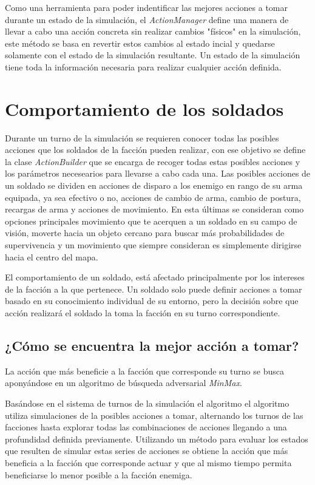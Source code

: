 \documentclass[twoside]{article}
\begin{document}
Como una herramienta para poder indentificar las mejores acciones a tomar durante un estado de la simulaci\'on, el \emph{ActionManager} define una manera de llevar a cabo una acci\'on concreta sin realizar cambios "f\'isicos" en la simulaci\'on, este m\'etodo se basa en revertir estos cambios al estado incial y quedarse solamente con el estado de la simulaci\'on resultante. Un estado de la simulaci\'on tiene toda la informaci\'on necesaria para realizar cualquier acci\'on definida. 


\section{Comportamiento de los soldados}

Durante un turno de la simulaci\'on se requieren conocer todas las posibles acciones que los soldados de la facci\'on pueden realizar, con ese objetivo se define la clase \emph{ActionBuilder} que se encarga de recoger todas estas posibles acciones y los par\'ametros necesearios para llevarse a cabo cada una. Las posibles acciones de un soldado se dividen en acciones de disparo a los enemigo en rango de su arma equipada, ya sea efectivo o no, acciones de cambio de arma, cambio de postura, recargas de arma y acciones de movimiento. En esta \'ultimas se consideran como opciones principales movimiento que te acerquen a un soldado en su campo de visi\'on, moverte hacia un objeto cercano para buscar m\'as probabilidades de supervivencia y un movimiento que siempre consideran es simplemente dirigirse hacia el centro del mapa.

El comportamiento de un soldado, est\'a afectado principalmente por los intereses de la facci\'on a la que pertenece. Un soldado solo puede definir acciones a tomar basado en su conocimiento individual de su entorno, pero la decisi\'on sobre que acci\'on realizar\'a el soldado la toma la facci\'on en su turno correspondiente.

\subsection{¿C\'omo se encuentra la mejor acci\'on a tomar?}

La acci\'on que m\'as beneficie a la facci\'on que corresponde su turno se busca apony\'andose en un algoritmo de b\'usqueda adversarial \emph{MinMax}.

Basándose en el sistema de turnos de la simulaci\'on el algoritmo el algoritmo utiliza simulaciones de la posibles acciones a tomar, alternando los turnos de las facciones hasta explorar todas las combinaciones de acciones llegando a una profundidad definida previamente. Utilizando un m\'etodo para evaluar los estados que resulten de simular estas series de acciones se obtiene la acci\'on que m\'as beneficia a la facci\'on que corresponde actuar y que al mismo tiempo permita beneficiarse lo menor posible a la facci\'on enemiga.
\end{document}
